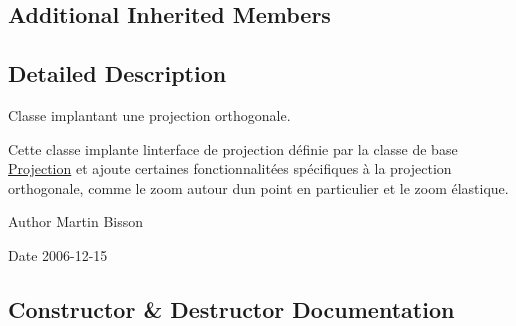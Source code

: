 \subsection*{Additional Inherited Members}


\subsection{Detailed Description}
Classe implantant une projection orthogonale. 

Cette classe implante l\textquotesingle{}interface de projection définie par la classe de base \hyperlink{classvue_1_1_projection}{Projection} et ajoute certaines fonctionnalitées spécifiques à la projection orthogonale, comme le zoom autour d\textquotesingle{}un point en particulier et le zoom élastique.

\begin{DoxyAuthor}{Author}
Martin Bisson 
\end{DoxyAuthor}
\begin{DoxyDate}{Date}
2006-\/12-\/15 
\end{DoxyDate}


\subsection{Constructor \& Destructor Documentation}
\hypertarget{classvue_1_1_projection_ortho_a06b243688202d77b06d88eea8f97bc1d}{}
